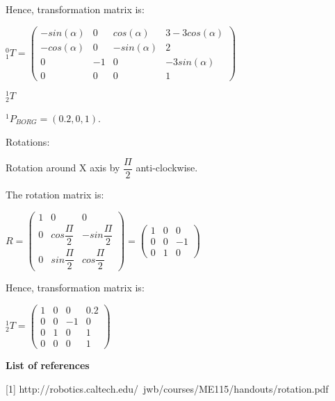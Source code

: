 \documentclass[12pt]{article}
\begin{document}
\begin{list}{)~}{}
Hence, transformation matrix is:

$_{1}^{0}T = \left(\begin{array}{cccc}
-sin\left(\alpha\right) & 0 & cos\left(\alpha\right) & 3-3cos\left(\alpha\right)\\
- cos\left(\alpha\right) & 0 & - sin\left(\alpha\right) & 2\\
0 & -1 & 0 & -3sin\left(\alpha\right)\\
0 & 0 & 0 & 1 \end{array}\right)$

\newpage

\item
$_{2}^{1}T$

$^1 P_{BORG} = \left(0.2, 0, 1\right)$.

Rotations:

\begin{list}{)~}{}
\item Rotation around X axis by $\dfrac{\Pi}{2}$ anti-clockwise.

\end{list}

The rotation matrix is:

$R=
\left(\begin{array}{ccc}
1 & 0 & 0\\
0 & cos \dfrac{\Pi}{2} & -sin \dfrac{\Pi}{2} \\
0 & sin \dfrac{\Pi}{2} & cos \dfrac{\Pi}{2} \end{array}\right)
=
\left(\begin{array}{ccc}
1 & 0 & 0\\
0 & 0 & -1\\
0 & 1 & 0\end{array}\right)$

Hence, transformation matrix is:

$_{2}^{1}T = \left(\begin{array}{cccc}
1 & 0 & 0 & 0.2\\
0 & 0 & -1 & 0\\
0 & 1 & 0 & 1\\
0 & 0 & 0 & 1\end{array}\right)$

\end{list}

\medskip

\textbf{List of references}

[1] http://robotics.caltech.edu/~jwb/courses/ME115/handouts/rotation.pdf
\end{document}
